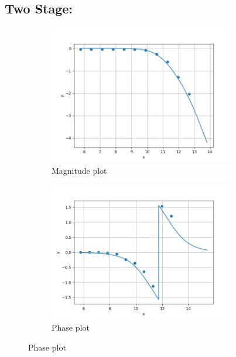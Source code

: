 \documentclass[a4paper,12pt]{article}
\begin{document}
\subsection*{Two Stage:}
\begin{figure}[h!]
	\begin{subfigure}[b]{100pt}
		\caption{Magnitude plot}
		\includegraphics[width = 230pt]{figs/fig3.png}
	\end{subfigure}
	\hspace{110pt}
	\begin{subfigure}[b]{100pt}
		\caption{Phase plot}
		\includegraphics[width = 230pt]{figs/fig4.png}
	\end{subfigure}
\end{figure}
\pagebreak
\end{document}
